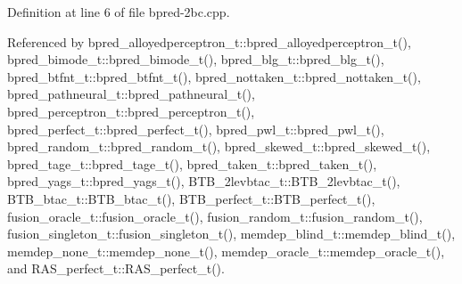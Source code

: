 Definition at line 6 of file bpred-2bc.cpp.

Referenced by bpred\_\-alloyedperceptron\_\-t::bpred\_\-alloyedperceptron\_\-t(), bpred\_\-bimode\_\-t::bpred\_\-bimode\_\-t(), bpred\_\-blg\_\-t::bpred\_\-blg\_\-t(), bpred\_\-btfnt\_\-t::bpred\_\-btfnt\_\-t(), bpred\_\-nottaken\_\-t::bpred\_\-nottaken\_\-t(), bpred\_\-pathneural\_\-t::bpred\_\-pathneural\_\-t(), bpred\_\-perceptron\_\-t::bpred\_\-perceptron\_\-t(), bpred\_\-perfect\_\-t::bpred\_\-perfect\_\-t(), bpred\_\-pwl\_\-t::bpred\_\-pwl\_\-t(), bpred\_\-random\_\-t::bpred\_\-random\_\-t(), bpred\_\-skewed\_\-t::bpred\_\-skewed\_\-t(), bpred\_\-tage\_\-t::bpred\_\-tage\_\-t(), bpred\_\-taken\_\-t::bpred\_\-taken\_\-t(), bpred\_\-yags\_\-t::bpred\_\-yags\_\-t(), BTB\_\-2levbtac\_\-t::BTB\_\-2levbtac\_\-t(), BTB\_\-btac\_\-t::BTB\_\-btac\_\-t(), BTB\_\-perfect\_\-t::BTB\_\-perfect\_\-t(), fusion\_\-oracle\_\-t::fusion\_\-oracle\_\-t(), fusion\_\-random\_\-t::fusion\_\-random\_\-t(), fusion\_\-singleton\_\-t::fusion\_\-singleton\_\-t(), memdep\_\-blind\_\-t::memdep\_\-blind\_\-t(), memdep\_\-none\_\-t::memdep\_\-none\_\-t(), memdep\_\-oracle\_\-t::memdep\_\-oracle\_\-t(), and RAS\_\-perfect\_\-t::RAS\_\-perfect\_\-t().